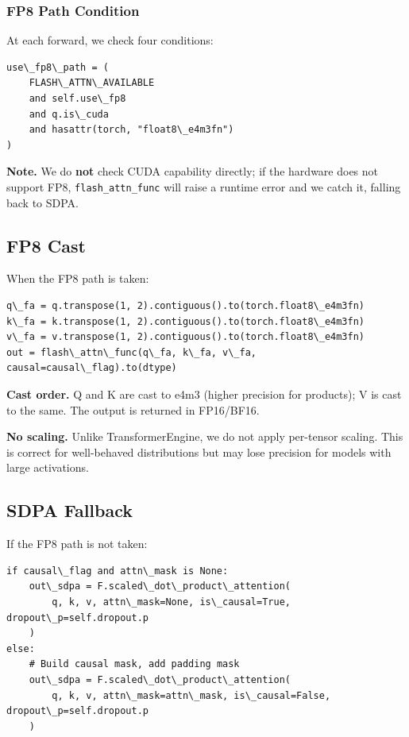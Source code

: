 \subsubsection{FP8 Path Condition}

At each forward, we check four conditions:

\begin{lstlisting}
use\_fp8\_path = (
    FLASH\_ATTN\_AVAILABLE
    and self.use\_fp8
    and q.is\_cuda
    and hasattr(torch, "float8\_e4m3fn")
)
\end{lstlisting}

\textbf{Note.} We do \textbf{not} check CUDA capability directly; if the hardware 
does not support FP8, \texttt{flash\_attn\_func} will raise a runtime error and we 
catch it, falling back to SDPA.

\subsection{FP8 Cast}

When the FP8 path is taken:

\begin{lstlisting}
q\_fa = q.transpose(1, 2).contiguous().to(torch.float8\_e4m3fn)
k\_fa = k.transpose(1, 2).contiguous().to(torch.float8\_e4m3fn)
v\_fa = v.transpose(1, 2).contiguous().to(torch.float8\_e4m3fn)
out = flash\_attn\_func(q\_fa, k\_fa, v\_fa, causal=causal\_flag).to(dtype)
\end{lstlisting}

\textbf{Cast order.} Q and K are cast to e4m3 (higher precision for products); 
V is cast to the same. The output is returned in FP16/BF16.

\textbf{No scaling.} Unlike TransformerEngine, we do not apply per-tensor scaling. 
This is correct for well-behaved distributions but may lose precision for 
models with large activations.

\subsection{SDPA Fallback}

If the FP8 path is not taken:

\begin{lstlisting}
if causal\_flag and attn\_mask is None:
    out\_sdpa = F.scaled\_dot\_product\_attention(
        q, k, v, attn\_mask=None, is\_causal=True, dropout\_p=self.dropout.p
    )
else:
    # Build causal mask, add padding mask
    out\_sdpa = F.scaled\_dot\_product\_attention(
        q, k, v, attn\_mask=attn\_mask, is\_causal=False, dropout\_p=self.dropout.p
    )
\end{lstlisting}

